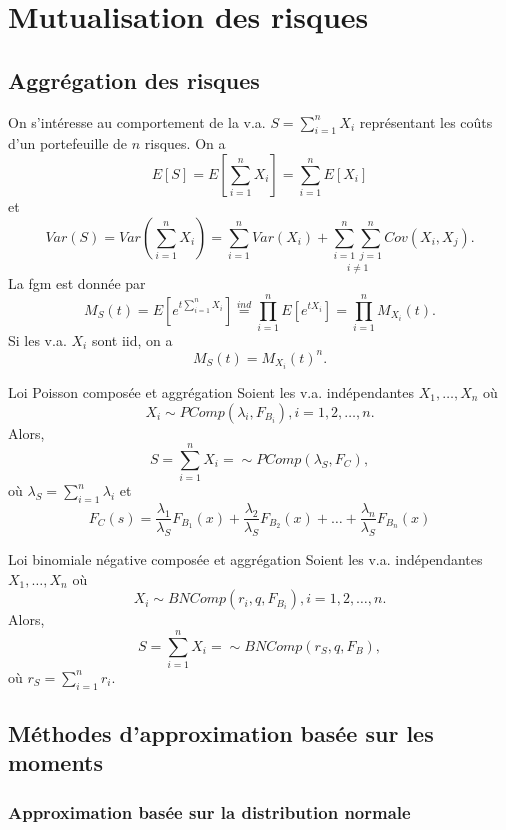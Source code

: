 \chapter{Mutualisation des risques}

\section{Aggrégation des risques}

On s'intéresse au comportement de la v.a. $S = \sum_{i = 1}^{n}X_i$ représentant les coûts  d'un portefeuille de $n$ risques. On a 
$$E[S] = E\left[\sum_{i = 1}^{n} X_i\right] = \sum_{i = 1}^{n}E[X_i]$$
et
$$Var(S) = Var\left(\sum_{i = 1}^{n}X_i\right) = \sum_{i = 1}^{n} Var(X_i) + \underset{i \neq 1}{\sum_{i = 1}^{n}\sum_{j = 1}^{n}}Cov(X_i, X_j).$$
La fgm est donnée par 
$$M_S(t) = E\left[e^{t\sum_{i = 1}^{n}X_i}\right] \stackrel{ind}{=} \prod_{i = 1}^{n} E\left[e^{tX_i}\right] = \prod_{i = 1}^{n}M_{X_i}(t).$$
Si les v.a. $X_i$ sont iid, on a 
$$M_S(t) = M_{X_i}(t)^n.$$ 

\begin{proposition}{Loi Poisson composée et aggrégation}{}
	Soient les v.a. indépendantes $X_1, \dots, X_n$ où
	$$X_i \sim PComp(\lambda_i, F_{B_i}), i = 1, 2, \dots, n.$$
	Alors, 
	$$S = \sum_{i = 1}^{n} X_i = \sim PComp(\lambda_S, F_{C}),$$
	où $\lambda_S = \sum_{i = 1}^{n}\lambda_i$ et 
	$$F_{C}(s) = \frac{\lambda_1}{\lambda_S}F_{B_1}(x) + \frac{\lambda_2}{\lambda_S}F_{B_2}(x) + \dots + \frac{\lambda_n}{\lambda_S}F_{B_n}(x)$$
\end{proposition}

\begin{proposition}{Loi binomiale négative composée et aggrégation}{}
	Soient les v.a. indépendantes $X_1, \dots, X_n$ où
	$$X_i \sim BNComp(r_i, q, F_{B_i}), i = 1, 2, \dots, n.$$
	Alors, 
	$$S = \sum_{i = 1}^{n} X_i = \sim BNComp(r_S, q, F_{B}),$$
	où $r_S = \sum_{i = 1}^{n}r_i$.
\end{proposition}

\section{Méthodes d'approximation basée sur les moments}

\subsection{Approximation basée sur la distribution normale}

